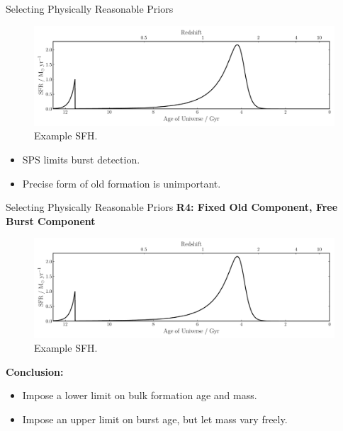 \documentclass{beamer}
\begin{document}
\begin{frame}{Selecting Physically Reasonable Priors}
  \begin{figure}
    \centering
    \includegraphics[width=\textwidth]{../pipes/plots/r0_priors/phil_model_4_sfh}
    \caption{Example SFH.}
  \end{figure}
  \begin{itemize}
    \item SPS limits burst detection.
    \item Precise form of old formation is unimportant.
  \end{itemize}
\end{frame}

\begin{frame}{Selecting Physically Reasonable Priors}
  \textbf{R4: Fixed Old Component, Free Burst Component}
  \begin{figure}
    \centering
    \includegraphics[width=\textwidth]{../pipes/plots/r0_priors/phil_model_4_sfh}
    \caption{Example SFH.}
  \end{figure}
  \textbf{Conclusion:}
  \begin{itemize}
    \item Impose a lower limit on bulk formation age and mass.
    \item Impose an upper limit on burst age, but let mass vary freely.
  \end{itemize}
\end{frame}
\end{document}
